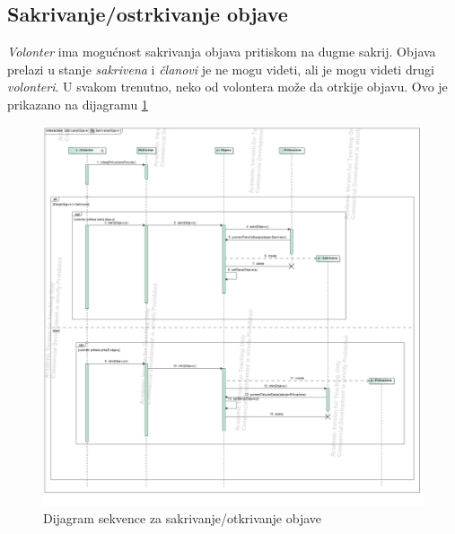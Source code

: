 \subsection{Sakrivanje/ostrkivanje objave}
\par \textit{Volonter} ima mogućnost sakrivanja objava pritiskom na dugme sakrij. Objava prelazi u stanje \textit{sakrivena} i \textit{članovi} je ne mogu videti,
ali je mogu videti drugi \textit{volonteri}. U svakom trenutno, neko od volontera može da otrkije objavu. Ovo je prikazano na dijagramu \ref{fig:hide-seq}
\begin{figure}[ht]
    \centering
    \includegraphics[width=\textwidth, height=\textwidth]{img/hide-post.jpg}
    \caption{Dijagram sekvence za sakrivanje/otkrivanje objave}
    \label{fig:hide-seq}
\end{figure}
